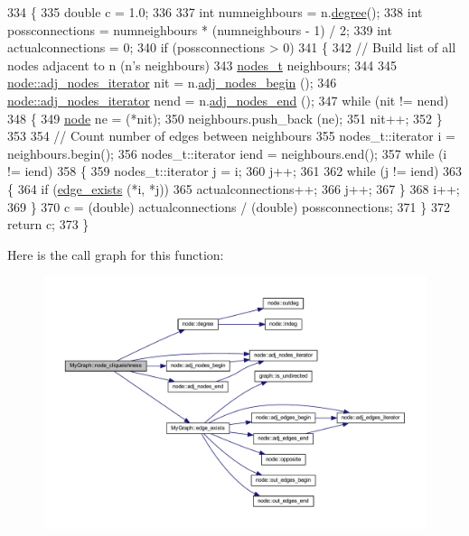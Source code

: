 \begin{DoxyCode}
334 \{
335     \textcolor{keywordtype}{double} c = 1.0;
336     
337     \textcolor{keywordtype}{int} numneighbours = n.\mbox{\hyperlink{classnode_a1e5e94e426da180a069cf307616e38e3}{degree}}();
338     \textcolor{keywordtype}{int} possconnections = numneighbours * (numneighbours - 1) / 2;
339     \textcolor{keywordtype}{int} actualconnections = 0;
340     \textcolor{keywordflow}{if} (possconnections > 0)
341     \{
342         \textcolor{comment}{// Build list of all nodes adjacent to n (n's neighbours)}
343         \mbox{\hyperlink{edge_8h_a22ac17689106ba21a84e7bc54d1199d6}{nodes\_t}} neighbours;
344         
345         \mbox{\hyperlink{classnode_a392f19ea6dfa344bdf5c4d5a4b25eb8c}{node::adj\_nodes\_iterator}} nit = n.\mbox{\hyperlink{classnode_a6cd2febf910bc6572c4aecba6278b100}{adj\_nodes\_begin}} ();
346         \mbox{\hyperlink{classnode_a392f19ea6dfa344bdf5c4d5a4b25eb8c}{node::adj\_nodes\_iterator}} nend = n.\mbox{\hyperlink{classnode_a2477fa92c56a19d29464082444a3043a}{adj\_nodes\_end}} ();
347         \textcolor{keywordflow}{while} (nit != nend)
348         \{
349             \mbox{\hyperlink{classnode}{node}} ne = (*nit);
350             neighbours.push\_back (ne);
351             nit++;
352         \}
353         
354         \textcolor{comment}{// Count number of edges between neighbours}
355         nodes\_t::iterator i = neighbours.begin();
356         nodes\_t::iterator iend = neighbours.end();
357         \textcolor{keywordflow}{while} (i != iend)
358         \{
359             nodes\_t::iterator j = i;
360             j++;
361             
362             \textcolor{keywordflow}{while} (j != iend)
363             \{
364                 \textcolor{keywordflow}{if} (\mbox{\hyperlink{class_my_graph_a67910a9535e93bc6dcf53e961760b6da}{edge\_exists}} (*i, *j))
365                     actualconnections++;
366                 j++;    
367             \}
368             i++;
369         \}
370         c = (double) actualconnections / (\textcolor{keywordtype}{double}) possconnections;          
371     \}
372     \textcolor{keywordflow}{return} c;
373 \}
\end{DoxyCode}
Here is the call graph for this function\+:
\nopagebreak
\begin{figure}[H]
\begin{center}
\leavevmode
\includegraphics[width=350pt]{class_my_graph_a513bec2f1949a01d517dd57cc9c30233_cgraph}
\end{center}
\end{figure}
